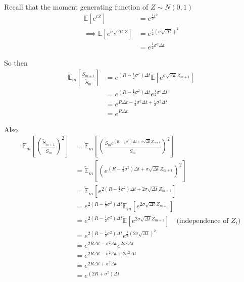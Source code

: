 \documentclass[12pt]{article}
\newcommand{\E}{\mathbb E}
\begin{document}
Recall that the moment generating function of $Z \sim N(0,1)$
\begin{align*}
	\E[e^{tZ}] &= e^{\frac{1}{2}t^2} \\
	\implies \E[e^{\sigma\sqrt{\Delta t} Z}] &=  e^{\frac{1}{2}(\sigma\sqrt{\Delta t})^2} \\
	&= e^{\frac{1}{2}\sigma^2\Delta t}
\end{align*}

So then
\begin{align*}
	\tilde{\E}_m \left[ \frac{\tilde{S}_{m + 1}}{\tilde{S}_m} \right] &=  e^{(R - \frac{1}{2}\sigma^2)\Delta t} \tilde{\E} \left[ e^{\sigma\sqrt{\Delta t}Z_{m + 1}} \right] \\
	&= e^{(R - \frac{1}{2}\sigma^2)\Delta t} e^{\frac{1}{2}\sigma^2\Delta t} \\
	&= e^{R\Delta t - \frac{1}{2}\sigma^2\Delta t + \frac{1}{2}\sigma^2\Delta t} \\
	&= e^{R\Delta t}
\end{align*}

Also
\begin{align*}
	\tilde{\E}_m \left[ \left( \frac{\tilde{S}_{m + 1}}{\tilde{S}_m} \right)^2 \right] &= \tilde{\E}_m \left[ \left( \frac{\tilde{S}_m e^{(R - \frac{1}{2}\sigma^2)\Delta t + \sigma\sqrt{\Delta t}Z_{m + 1}}}{ \tilde{S}_m } \right)^2 \right] \\
	&= \tilde{\E}_m \left[ \left( e^{(R - \frac{1}{2}\sigma^2)\Delta t + \sigma\sqrt{\Delta t}Z_{m + 1}} \right)^2 \right] \\
	&= \tilde{\E}_m \left[ e^{2(R - \frac{1}{2}\sigma^2)\Delta t + 2\sigma\sqrt{\Delta t}Z_{m + 1}} \right] \\
	&= e^{2(R - \frac{1}{2}\sigma^2)\Delta t} \tilde{\E}_m \left[ e^{2\sigma\sqrt{\Delta t}Z_{m + 1}} \right] \\
	&= e^{2(R - \frac{1}{2}\sigma^2)\Delta t} \tilde{\E} \left[ e^{2\sigma\sqrt{\Delta t}Z_{m + 1}} \right] \quad \text{(independence of $Z_i$)} \\
	&= e^{2(R - \frac{1}{2}\sigma^2)\Delta t} e^{\frac{1}{2}(2\sigma\sqrt{\Delta t})^2} \\
	&= e^{2R\Delta t - \sigma^2\Delta t} e^{2\sigma^2\Delta t} \\
	&= e^{2R\Delta t - \sigma^2\Delta t + 2\sigma^2\Delta t}  \\
	&= e^{2R\Delta t + \sigma^2\Delta t}  \\
	&= e^{(2R + \sigma^2)\Delta t}
\end{align*}
\end{document}
